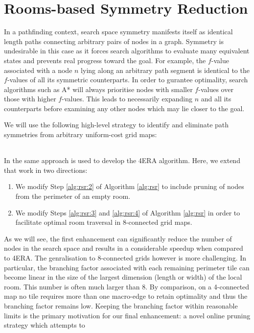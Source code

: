 \section{Rooms-based Symmetry Reduction}
In a pathfinding context, search space symmetry manifests itself as identical
length paths connecting arbitrary pairs of nodes in a graph. 
Symmetry is undesirable in this case as it forces search algorithms to evaluate 
many equivalent states and prevents real progress toward the goal.
For example, the $f$-value associated with a node $n$ lying along an arbitrary
 path segment is identical to the $f$-values of all its symmetric counterparts.
In order to gurantee optimality, search algorithms such as A* will always prioritise
nodes with smaller $f$-values over those with higher $f$-values. This leads to
necessarily expanding $n$ and all its counterparts before examining any other
nodes which may lie closer to the goal.
\par
We will use the following high-level strategy to identify and eliminate 
path symmetries from arbitrary uniform-cost grid maps: 

\\
In \cite{harabor10} the same approach is used to develop the 4ERA algorithm.
Here, we extend that work in two directions:
\begin{enumerate}
\item{
We modify Step \ref{alg:rsr:2} of Algorithm \ref{alg:rsr} 
to include pruning of nodes from the perimeter of an empty room.
}
\item{
We modify Steps \ref{alg:rsr:3} and \ref{alg:rsr:4} of Algorithm
\ref{alg:rsr} in order to facilitate optimal room traversal in 8-connected grid
maps. 
}
\end{enumerate}
As we will see, the first enhancement can significantly reduce the number of nodes
in the search space and results in a considerable speedup when compared to 4ERA.
The genralisation to 8-connected grids however is more challenging.
In particular, the branching factor associated with each remaining perimeter tile 
can become linear in the size of the largest dimension (length or width) of the local room. 
This number is often much larger than 8. 
By comparison, on a 4-connected map no tile requires more than one macro-edge 
to retain optimality and thus the branching factor remains low. 
Keeping the branching factor within reasonable limits is the primary motivation
for our final enhancement: a novel online pruning strategy which attempts to
